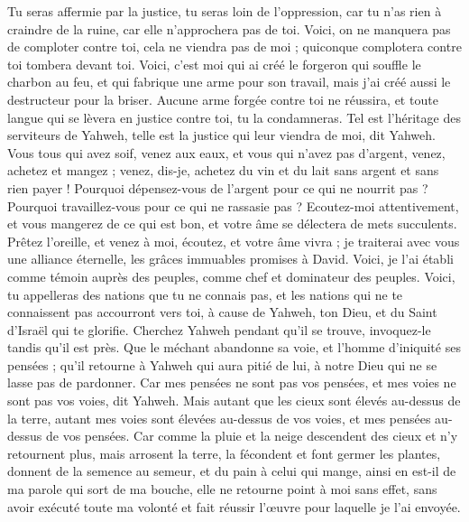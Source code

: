 \begin{multicols}{2}
Tu seras affermie par la justice, tu seras loin de l'oppression, car tu n'as rien à craindre de la ruine, car elle n'approchera pas de toi.
Voici, on ne manquera pas de comploter contre toi, cela ne viendra pas de moi ; quiconque complotera contre toi tombera devant toi.
Voici, c'est moi qui ai créé le forgeron qui souffle le charbon au feu, et qui fabrique une arme pour son travail, mais j'ai créé aussi le destructeur pour la briser.
Aucune arme forgée contre toi ne réussira, et toute langue qui se lèvera en justice contre toi, tu la condamneras. Tel est l'héritage des serviteurs de Yahweh, telle est la justice qui leur viendra de moi, dit Yahweh.
\VerseOne{}Vous tous qui avez soif, venez aux eaux, et vous qui n'avez pas d'argent, venez, achetez et mangez ; venez, dis-je, achetez du vin et du lait sans argent et sans rien payer !
Pourquoi dépensez-vous de l'argent pour ce qui ne nourrit pas ? Pourquoi travaillez-vous pour ce qui ne rassasie pas ? Ecoutez-moi attentivement, et vous mangerez de ce qui est bon, et votre âme se délectera de mets succulents.
Prêtez l'oreille, et venez à moi, écoutez, et votre âme vivra ; je traiterai avec vous une alliance éternelle, les grâces immuables promises à David.
Voici, je l'ai établi comme témoin auprès des peuples, comme chef et dominateur des peuples.
Voici, tu appelleras des nations que tu ne connais pas, et les nations qui ne te connaissent pas accourront vers toi, à cause de Yahweh, ton Dieu, et du Saint d'Israël qui te glorifie.
Cherchez Yahweh pendant qu'il se trouve, invoquez-le tandis qu'il est près.
Que le méchant abandonne sa voie, et l'homme d'iniquité ses pensées ; qu'il retourne à Yahweh qui aura pitié de lui, à notre Dieu qui ne se lasse pas de pardonner.
Car mes pensées ne sont pas vos pensées, et mes voies ne sont pas vos voies, dit Yahweh.
Mais autant que les cieux sont élevés au-dessus de la terre, autant mes voies sont élevées au-dessus de vos voies, et mes pensées au-dessus de vos pensées.
Car comme la pluie et la neige descendent des cieux et n'y retournent plus, mais arrosent la terre, la fécondent et font germer les plantes, donnent de la semence au semeur, et du pain à celui qui mange,
ainsi en est-il de ma parole qui sort de ma bouche, elle ne retourne point à moi sans effet, sans avoir exécuté toute ma volonté et fait réussir l'œuvre pour laquelle je l'ai envoyée.

\end{multicols}
